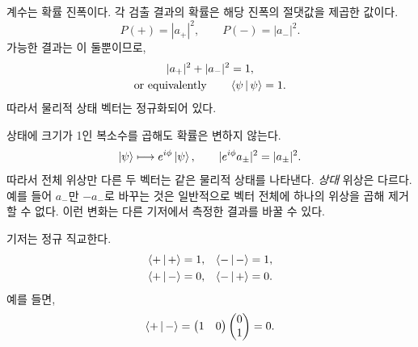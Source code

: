 계수는 확률 진폭이다. 각 검출 결과의 확률은 해당 진폭의 절댓값을 제곱한 값이다.
\begin{equation}
  P(+)=|a_+|^2,
  \qquad
  P(-)=|a_-|^2.
  \label{eq:l02-born-rule}
\end{equation}
가능한 결과는 이 둘뿐이므로,
\begin{equation}
  \begin{gathered}
    |a_+|^2+|a_-|^2=1,\\
    \text{or equivalently}\qquad \left\langle\psi\,\middle|\,\psi\right\rangle=1.
  \end{gathered}
  \label{eq:l02-normalization}
\end{equation}
따라서 물리적 상태 벡터는 정규화되어 있다.

\begin{classroomqa}
\end{classroomqa}

상태에 크기가 1인 복소수를 곱해도 확률은 변하지 않는다.
\begin{equation}
  \left\lvert\psi\right\rangle\longmapsto e^{i\phi}\left\lvert\psi\right\rangle,
  \qquad
  |e^{i\phi}a_\pm|^2=|a_\pm|^2.
  \label{eq:l02-global-phase}
\end{equation}
따라서 전체 위상만 다른 두 벡터는 같은 물리적 상태를 나타낸다. \emph{상대} 위상은 다르다. 예를 들어 \(a_-\)만 \(-a_-\)로 바꾸는 것은 일반적으로 벡터 전체에 하나의 위상을 곱해 제거할 수 없다. 이런 변화는 다른 기저에서 측정한 결과를 바꿀 수 있다.

\begin{classroomqa}
\end{classroomqa}

기저는 정규 직교한다.
\begin{align}
  \left\langle+\,\middle|\,+\right\rangle&=1,
  &\left\langle-\,\middle|\,-\right\rangle&=1,
  \notag\\
  \left\langle+\,\middle|\,-\right\rangle&=0,
  &\left\langle-\,\middle|\,+\right\rangle&=0.
  \label{eq:l02-orthonormality}
\end{align}
예를 들면,
\begin{equation}
  \left\langle+\,\middle|\,-\right\rangle
  =
  \begin{pmatrix}1&0\end{pmatrix}
  \begin{pmatrix}0\\1\end{pmatrix}
  =0.
\end{equation}

